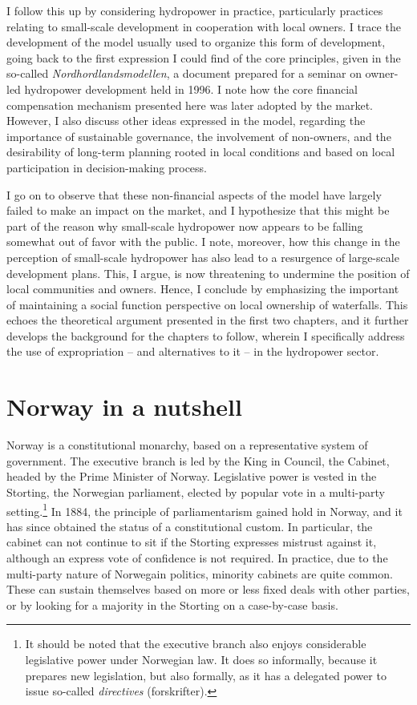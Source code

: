 I follow this up by considering hydropower in practice, particularly practices relating to small-scale development in cooperation with local owners. I trace the development of the model usually used to organize this form of development, going back to the first expression I could find of the core principles, given in the so-called {\it Nordhordlandsmodellen}, a document prepared for a seminar on owner-led hydropower development held in 1996. I note how the core financial compensation mechanism presented here was later adopted by the market. However, I also discuss other ideas expressed in the model, regarding the importance of sustainable governance, the involvement of non-owners, and the desirability of long-term planning rooted in local conditions and based on local participation in decision-making process.

I go on to observe that these non-financial aspects of the model have largely failed to make an impact on the market, and I hypothesize that this might be part of the reason why small-scale hydropower now appears to be falling somewhat out of favor with the public. I note, moreover, how this change in the perception of small-scale hydropower has also lead to a resurgence of large-scale development plans. This, I argue, is now threatening to undermine the position of local communities and owners. Hence, I conclude by emphasizing the important of maintaining a social function perspective on local ownership of waterfalls. This echoes the theoretical argument presented in the first two chapters, and it further develops the background for the chapters to follow, wherein I specifically address the use of expropriation -- and alternatives to it --  in the hydropower sector.

\section{Norway in a nutshell}\label{sec:nutshell}

Norway is a constitutional monarchy, based on a representative system of government. The executive branch is led by the King in Council, the Cabinet, headed by the Prime Minister of Norway. Legislative power is vested in the Storting, the Norwegian parliament, elected by popular vote in a multi-party setting.\footnote{It should be noted that the executive branch also enjoys considerable legislative power under Norwegian law. It does so informally, because it prepares new legislation, but also formally, as it has a delegated power to issue so-called {\it directives} (forskrifter).} In 1884, the principle of parliamentarism gained hold in Norway, and it has since obtained the status of a constitutional custom. In particular, the cabinet can not continue to sit if the Storting expresses mistrust against it, although an express vote of confidence is not required. In practice, due to the multi-party nature of Norwegain politics, minority cabinets are quite common. These can sustain themselves based on more or less fixed deals with other parties, or  by looking for a majority in the Storting on a case-by-case basis.

